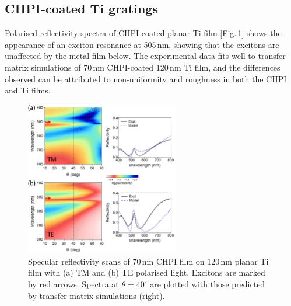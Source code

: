 \subsection{CHPI-coated Ti gratings}
Polarised reflectivity spectra of CHPI-coated planar Ti film [Fig.\,\ref{7Fig5}] shows the appearance of an exciton resonance at 505\,nm, showing that the excitons are unaffected by the metal film below. The experimental data fits well to transfer matrix simulations of 70\,nm CHPI-coated 120\,nm Ti film, and the differences observed can be attributed to non-uniformity and roughness in both the CHPI and Ti films.
\begin{figure}[ht] 
\centering    
\includegraphics[width=0.6\textwidth]{Fig5}
\caption{Specular reflectivity scans of 70\,nm CHPI film on 120\,nm planar Ti film with (a) TM and (b) TE polarised light. Excitons are marked by red arrows. Spectra at $\theta=40^{\circ}$ are plotted with those predicted by transfer matrix simulations (right).}
\label{7Fig5}
\end{figure}

